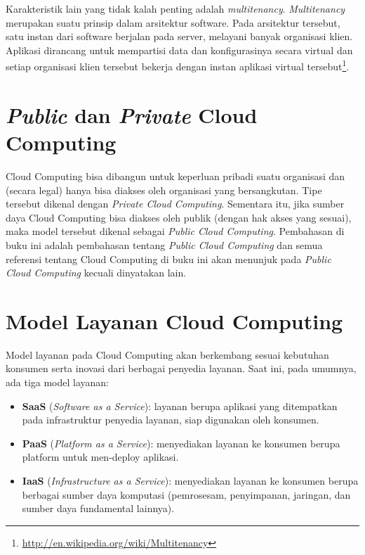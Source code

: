 Karakteristik lain yang tidak kalah penting adalah \textit{multitenancy}. \textit{Multitenancy} merupakan suatu prinsip dalam arsitektur software. Pada arsitektur tersebut, satu instan dari software berjalan pada server, melayani banyak organisasi klien. Aplikasi dirancang untuk mempartisi data dan konfigurasinya secara virtual dan setiap organisasi klien tersebut bekerja dengan instan aplikasi virtual tersebut\footnote{\url{http://en.wikipedia.org/wiki/Multitenancy}}. 

\section{\textit{Public} dan \textit{Private} Cloud Computing}

Cloud Computing bisa dibangun untuk keperluan pribadi suatu organisasi dan (secara legal) hanya bisa diakses oleh organisasi yang bersangkutan. Tipe tersebut dikenal dengan \textit{Private Cloud Computing}. Sementara itu, jika sumber daya Cloud Computing bisa diakses oleh publik (dengan hak akses yang sesuai), maka model tersebut dikenal sebagai \textit{Public Cloud Computing}. Pembahasan di buku ini adalah pembahasan tentang \textit{Public Cloud Computing} dan semua referensi tentang Cloud Computing di buku ini akan menunjuk pada \textit{Public Cloud Computing} kecuali dinyatakan lain.

\section{Model Layanan Cloud Computing}

Model layanan pada Cloud Computing akan berkembang sesuai kebutuhan konsumen serta inovasi dari berbagai penyedia layanan. Saat ini, pada umumnya, ada tiga model layanan:
\begin{itemize}
  \item \textbf{SaaS} (\textit{Software as a Service}): layanan berupa aplikasi yang ditempatkan pada infrastruktur penyedia layanan, siap digunakan oleh konsumen.
  \item \textbf{PaaS} (\textit{Platform as a Service}): menyediakan layanan ke konsumen berupa platform untuk men-deploy aplikasi.
  \item \textbf{IaaS} (\textit{Infrastructure as a Service}): menyediakan layanan ke konsumen berupa berbagai sumber daya komputasi (pemrosesam, penyimpanan, jaringan, dan sumber daya fundamental lainnya).
\end{itemize}

